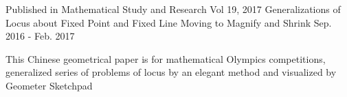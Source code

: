 \begin{cventries}
  \cventry
    {Published in Mathematical Study and Research Vol 19, 2017} %
    {Generalizations of Locus about Fixed Point and Fixed Line Moving to Magnify and Shrink} %
    {} %
    {Sep. 2016 - Feb. 2017} %
    {
      \begin{cvitems} %
        \item {This Chinese geometrical paper is for mathematical Olympics competitions, generalized series of problems of locus by an elegant method and visualized by Geometer Sketchpad}
      \end{cvitems}
    }
    

\end{cventries}
